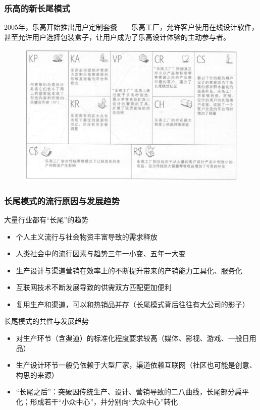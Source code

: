     \subsubsection{乐高的新长尾模式}
    2005年，乐高开始推出用户定制套餐——乐高工厂，允许客户使用在线设计软件，甚至允许用户选择包装盒子，让用户成为了乐高设计体验的主动参与者。
    \begin{figure}[H]
		\centering
        \vspace{-0.5em}
		\includegraphics[width=\textwidth]{img/乐高的新长尾模式.png}
        \vspace{-0.5em}
	\end{figure}

    \subsubsection{长尾模式的流行原因与发展趋势}
    大量行业都有“长尾”的趋势
    \begin{itemize}
        \item 个人主义流行与社会物资丰富导致的需求释放
        \item 人类社会中的流行因素与趋势三年一小变、五年一大变
        \item 生产设计与渠道营销在效率上的不断提升带来的产销能力工具化、服务化
        \item 互联网技术不断发展导致的供需双方匹配更加便利
        \item 复用生产和渠道，可以和热销品并存（长尾模式背后往往有大公司的影子）
    \end{itemize}

    长尾模式的共性与发展趋势
    \begin{itemize}
        \item 对生产环节（含渠道）的标准化程度要求较高（媒体、影视、游戏、一般日用品）
        \item 生产设计环节一般仍依赖于大型厂家，渠道依赖互联网（社区也可能是创意、构思的来源）
        \item “长尾之后”：突破因传统生产、设计、营销导致的二八曲线，长尾部分扁平化；形成若干“小众中心”，并分别向“大众中心”转化
    \end{itemize}


